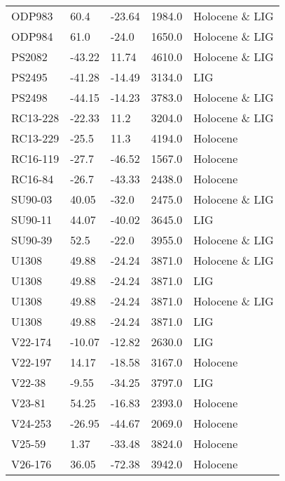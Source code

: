 \begin{longtable}{lllrl}
           ODP983 &     60.4 &    -23.64 &     1984.0 &  Holocene \& LIG \\
           ODP984 &     61.0 &     -24.0 &     1650.0 &  Holocene \& LIG \\
           PS2082 &   -43.22 &     11.74 &     4610.0 &  Holocene \& LIG \\
           PS2495 &   -41.28 &    -14.49 &     3134.0 &             LIG \\
           PS2498 &   -44.15 &    -14.23 &     3783.0 &  Holocene \& LIG \\
         RC13-228 &   -22.33 &      11.2 &     3204.0 &  Holocene \& LIG \\
         RC13-229 &    -25.5 &      11.3 &     4194.0 &        Holocene \\
         RC16-119 &    -27.7 &    -46.52 &     1567.0 &        Holocene \\
          RC16-84 &    -26.7 &    -43.33 &     2438.0 &        Holocene \\
          SU90-03 &    40.05 &     -32.0 &     2475.0 &  Holocene \& LIG \\
          SU90-11 &    44.07 &    -40.02 &     3645.0 &             LIG \\
          SU90-39 &     52.5 &     -22.0 &     3955.0 &  Holocene \& LIG \\
            U1308 &    49.88 &    -24.24 &     3871.0 &  Holocene \& LIG \\
            U1308 &    49.88 &    -24.24 &     3871.0 &             LIG \\
            U1308 &    49.88 &    -24.24 &     3871.0 &  Holocene \& LIG \\
            U1308 &    49.88 &    -24.24 &     3871.0 &             LIG \\
          V22-174 &   -10.07 &    -12.82 &     2630.0 &             LIG \\
          V22-197 &    14.17 &    -18.58 &     3167.0 &        Holocene \\
           V22-38 &    -9.55 &    -34.25 &     3797.0 &             LIG \\
           V23-81 &    54.25 &    -16.83 &     2393.0 &        Holocene \\
          V24-253 &   -26.95 &    -44.67 &     2069.0 &        Holocene \\
           V25-59 &     1.37 &    -33.48 &     3824.0 &        Holocene \\
          V26-176 &    36.05 &    -72.38 &     3942.0 &        Holocene \\

\end{longtable}
